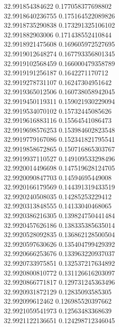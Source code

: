 {32.991854384622	0.177058377698802\\
32.9918640236755	0.175164522089826\\
32.9918735290838	0.173291325106102\\
32.991882903006	0.171438552410844\\
32.9918921475608	0.169605972527695\\
32.9919012648274	0.167793356801345\\
32.9919102568459	0.166000479358789\\
32.9919191256187	0.1642271170712\\
32.9919278731107	0.16247304951642\\
32.9919365012506	0.160738058942045\\
32.9919450119311	0.159021930229094\\
32.9919534070102	0.15732445085626\\
32.9919616883116	0.15564541086473\\
32.9919698576253	0.153984602823548\\
32.9919779167086	0.152341821795541\\
32.9919858672865	0.150716865303767\\
32.9919937110527	0.149109533298496\\
32.9920014496698	0.147519628124705\\
32.9920090847703	0.14594695449008\\
32.9920166179569	0.144391319433519\\
32.9920240508035	0.14285253229412\\
32.9920313848555	0.14133040468065\\
32.9920386216305	0.139824750441484\\
32.9920457626186	0.138335385635014\\
32.9920528092835	0.136862128500504\\
32.9920597630626	0.135404799429392\\
32.9920666253676	0.133963220937037\\
32.9920733975851	0.132537217634892\\
32.9920800810772	0.131126616203097\\
32.9920866771817	0.129731245363496\\
32.9920931872129	0.12835093585305\\
32.992099612462	0.126985520397662\\
32.9921059541973	0.12563483368639\\
32.9921122136651	0.124298712346045\\
}
